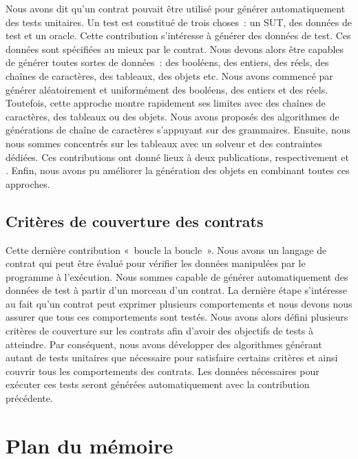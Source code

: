 Nous avons dit qu'un contrat pouvait être utilisé pour générer automatiquement
des tests unitaires. Un test est constitué de trois choses~: un SUT, des données
de test et un oracle. Cette contribution s'intéresse à générer des données de
test. Ces données sont spécifiées au mieux par le contrat. Nous devons alors
être capables de générer toutes sortes de données~: des booléens, des entiers,
des réels, des chaînes de caractères, des tableaux, des objets etc. Nous avons
commencé par générer aléatoirement et uniformément des booléens, des entiers et
des réels. Toutefois, cette approche montre rapidement ses limites avec des
chaînes de caractères, des tableaux ou des objets. Nous avons proposés des
algorithmes de générations de chaîne de caractères s'appuyant sur des
grammaires. Ensuite, nous nous sommes concentrés sur les tableaux avec un
solveur et des contraintes dédiées. Ces contributions ont donné lieux à deux
publications, respectivement  et .
Enfin, nous avons pu améliorer la génération des objets en combinant toutes ces
approches.

\subsection{Critères de couverture des contrats}

Cette dernière contribution «~boucle la boucle~». Nous avons un langage de
contrat qui peut être évalué pour vérifier les données manipulées par le
programme à l'exécution. Nous sommes capable de générer automatiquement des
données de test à partir d'un morceau d'un contrat. La dernière étape
s'intéresse au fait qu'un contrat peut exprimer plusieurs comportements et nous
devons nous assurer que tous ces comportements sont testés. Nous avons alors
défini plusieurs critères de couverture sur les contrats afin d'avoir des
objectifs de tests à atteindre. Par conséquent, nous avons développer des
algorithmes générant autant de tests unitaires que nécessaire pour satisfaire
certains critères et ainsi couvrir tous les comportements des contrats. Les
données nécessaires pour exécuter ces tests seront générées automatiquement avec
la contribution précédente.

\section{Plan du mémoire}

